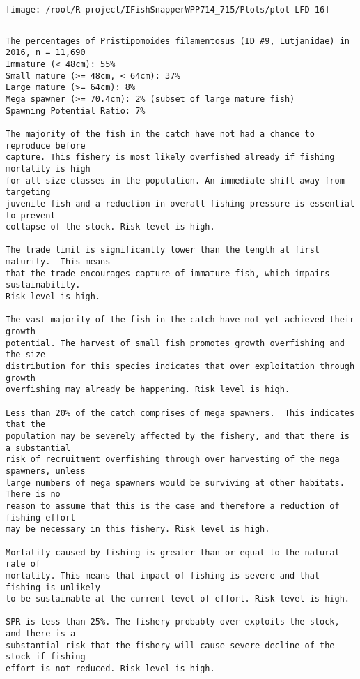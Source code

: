 \documentclass{report}\usepackage[]{graphicx}\usepackage[]{color}
\makeatletter
\def\maxwidth{ %
  \ifdim\Gin@nat@width>\linewidth
    \linewidth
  \else
    \Gin@nat@width
  \fi
}
\newenvironment{kframe}{%
 \def\at@end@of@kframe{}%
 \ifinner\ifhmode%
  \def\at@end@of@kframe{\end{minipage}}%
  \begin{minipage}{\columnwidth}%
 \fi\fi%
 \def\FrameCommand##1{\hskip\@totalleftmargin \hskip-\fboxsep
 \colorbox{shadecolor}{##1}\hskip-\fboxsep
     \hskip-\linewidth \hskip-\@totalleftmargin \hskip\columnwidth}%
 \MakeFramed {\advance\hsize-\width
   \@totalleftmargin\z@ \linewidth\hsize
   \@setminipage}}%
 {\par\unskip\endMakeFramed%
 \at@end@of@kframe}
\newenvironment{knitrout}{}{} %
\makeatother
\begin{document}
\begin{knitrout}
\texttt{[image: /root/R-project/IFishSnapperWPP714\_715/Plots/plot-LFD-16]} 
\begin{kframe}\begin{verbatim}
\end{verbatim}
\end{kframe}
\clearpage
\newpage
\begin{kframe}\begin{verbatim}The percentages of Pristipomoides filamentosus (ID #9, Lutjanidae) in 2016, n = 11,690
Immature (< 48cm): 55%
Small mature (>= 48cm, < 64cm): 37%
Large mature (>= 64cm): 8%
Mega spawner (>= 70.4cm): 2% (subset of large mature fish)
Spawning Potential Ratio: 7%
 
The majority of the fish in the catch have not had a chance to reproduce before
capture. This fishery is most likely overfished already if fishing mortality is high
for all size classes in the population. An immediate shift away from targeting
juvenile fish and a reduction in overall fishing pressure is essential to prevent
collapse of the stock. Risk level is high.

The trade limit is significantly lower than the length at first maturity.  This means
that the trade encourages capture of immature fish, which impairs sustainability.
Risk level is high.

The vast majority of the fish in the catch have not yet achieved their growth
potential. The harvest of small fish promotes growth overfishing and the size
distribution for this species indicates that over exploitation through growth
overfishing may already be happening. Risk level is high.

Less than 20% of the catch comprises of mega spawners.  This indicates that the
population may be severely affected by the fishery, and that there is a substantial
risk of recruitment overfishing through over harvesting of the mega spawners, unless
large numbers of mega spawners would be surviving at other habitats. There is no
reason to assume that this is the case and therefore a reduction of fishing effort
may be necessary in this fishery. Risk level is high.
 
Mortality caused by fishing is greater than or equal to the natural rate of
mortality. This means that impact of fishing is severe and that fishing is unlikely
to be sustainable at the current level of effort. Risk level is high.
 
SPR is less than 25%. The fishery probably over-exploits the stock, and there is a
substantial risk that the fishery will cause severe decline of the stock if fishing
effort is not reduced. Risk level is high.
 

\end{verbatim}
\end{kframe}
\end{knitrout}
\end{document}
